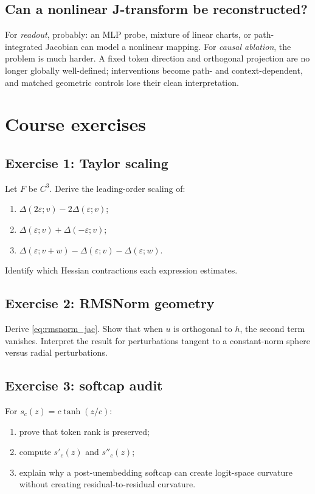 \documentclass[11pt]{article}
\newcommand{\eps}{\varepsilon}
\theoremstyle{definition}
\theoremstyle{remark}
\begin{document}
\subsection{Can a nonlinear J-transform be reconstructed?}
For \emph{readout}, probably: an MLP probe, mixture of linear charts, or path-integrated Jacobian can model a nonlinear mapping. For \emph{causal ablation}, the problem is much harder. A fixed token direction and orthogonal projection are no longer globally well-defined; interventions become path- and context-dependent, and matched geometric controls lose their clean interpretation.

\section{Course exercises}

\subsection*{Exercise 1: Taylor scaling}
Let $F$ be $C^3$. Derive the leading-order scaling of:
\begin{enumerate}[label=(\alph*)]
  \item $\Delta(2\eps;v)-2\Delta(\eps;v)$;
  \item $\Delta(\eps;v)+\Delta(-\eps;v)$;
  \item $\Delta(\eps;v+w)-\Delta(\eps;v)-\Delta(\eps;w)$.
\end{enumerate}
Identify which Hessian contractions each expression estimates.

\subsection*{Exercise 2: RMSNorm geometry}
Derive \cref{eq:rmsnorm_jac}. Show that when $u$ is orthogonal to $h$, the second term vanishes. Interpret the result for perturbations tangent to a constant-norm sphere versus radial perturbations.

\subsection*{Exercise 3: softcap audit}
For $s_c(z)=c\tanh(z/c)$:
\begin{enumerate}[label=(\alph*)]
  \item prove that token rank is preserved;
  \item compute $s'_c(z)$ and $s''_c(z)$;
  \item explain why a post-unembedding softcap can create logit-space curvature without creating residual-to-residual curvature.
\end{enumerate}
\end{document}
